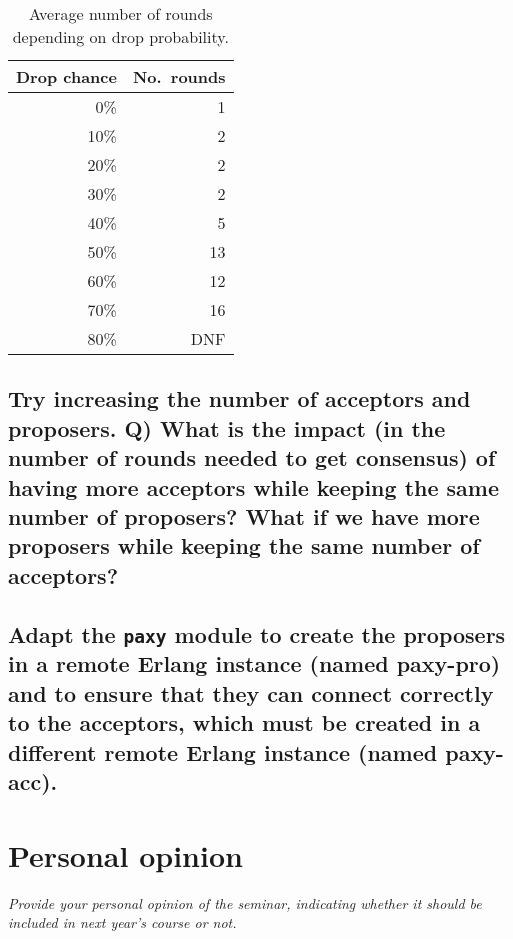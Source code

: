 \documentclass[a4paper, 10pt]{article}
\begin{document}
\begin{table}[htp]
\centering
\caption{Average number of rounds depending on drop probability.}
\label{tab:drop-chance}
\begin{tabular}{rr}
\toprule
Drop chance\! & No.~rounds   \\ \midrule
0\%           & 1                 \\
10\%          & 2                 \\
20\%          & 2                 \\
30\%          & 2                 \\
40\%          & 5                 \\
50\%          & 13                \\
60\%          & 12                \\
70\%          & 16                \\
80\%          & DNF               \\ \bottomrule
\end{tabular}
\end{table}

\subsection{\!Try increasing the number of acceptors and proposers. Q) What is the impact (in the number of rounds needed to get consensus) of having more acceptors while keeping the same number of proposers? What if we have more proposers while keeping the same number of acceptors?}

\subsection{Adapt the \texttt{paxy} module to create the proposers in a remote Erlang instance (named paxy-pro) and to ensure that they can connect correctly to the
acceptors, which must be created in a different remote Erlang instance (named
paxy-acc).}

\section{Personal opinion}

\textit{Provide your personal opinion of the seminar, indicating whether it should be included in next year's course or not.}
\end{document}
